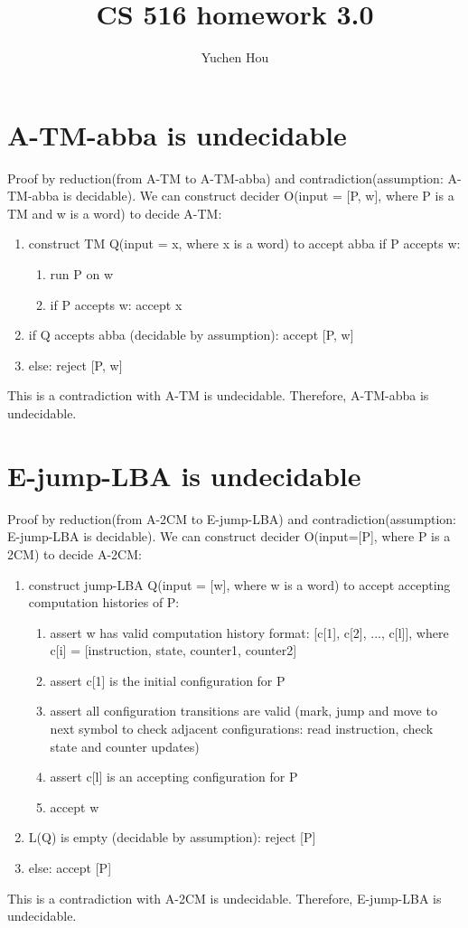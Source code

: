 \documentclass{article}
\begin{document}
\lstset{language=python, tabsize=4}
\title{CS 516 homework 3.0}
\author{Yuchen Hou}
\maketitle

\section{A-TM-abba is undecidable}
Proof by reduction(from A-TM to A-TM-abba) and contradiction(assumption: 
A-TM-abba is decidable).
We can construct decider O(input = [P, w], where P is a TM and w is a word) to decide A-TM:
\begin{enumerate}
	\item construct TM Q(input = x, where x is a word) to accept abba if P 
	accepts w:
	\begin{enumerate}
		\item run P on w
		\item if P accepts w: accept x
	\end{enumerate}
	\item if Q accepts abba (decidable by assumption): accept [P, w]
	\item else: reject [P, w]
\end{enumerate}
This is a contradiction with A-TM is undecidable. Therefore, A-TM-abba is undecidable.

\section{E-jump-LBA is undecidable}
Proof by reduction(from A-2CM to E-jump-LBA) and contradiction(assumption: 
E-jump-LBA is decidable).
We can construct decider O(input=[P], where P is a 2CM) to decide A-2CM:
\begin{enumerate}
	\item construct jump-LBA Q(input = [w], where w is a word) to accept accepting computation histories of P:
	\begin{enumerate}
		\item assert w has valid computation history format: [c[1], c[2], ..., c[l]], where c[i] = [instruction, state, counter1, counter2]
		\item assert c[1] is the initial configuration for P
		\item assert all configuration transitions are valid (mark, jump and move to next symbol to check adjacent configurations: read instruction, check state and counter updates)
		\item assert c[l] is an accepting configuration for P
		\item accept w
	\end{enumerate}
	\item L(Q) is empty (decidable by assumption): reject [P]
	\item else: accept [P]
\end{enumerate}
This is a contradiction with A-2CM is undecidable. Therefore, E-jump-LBA is undecidable.
\end{document}
